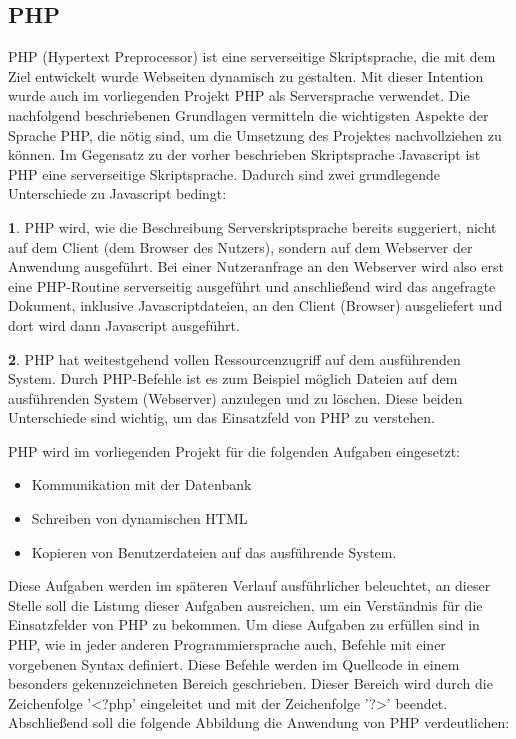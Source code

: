 \subsection{PHP}
\label{sec:Php}

PHP (Hypertext Preprocessor) ist eine serverseitige Skriptsprache, die mit dem Ziel entwickelt wurde Webseiten dynamisch
zu gestalten.
Mit dieser Intention wurde auch im vorliegenden Projekt PHP als Serversprache verwendet. Die nachfolgend beschriebenen
Grundlagen vermitteln die wichtigsten Aspekte der Sprache PHP, die nötig sind, um die Umsetzung des Projektes
nachvollziehen zu können.
Im Gegensatz zu der vorher beschrieben Skriptsprache Javascript ist PHP eine serverseitige Skriptsprache. Dadurch sind
zwei grundlegende Unterschiede zu Javascript bedingt:

\textbf{1}. PHP wird, wie die Beschreibung Serverskriptsprache bereits suggeriert, nicht auf dem Client (dem Browser des Nutzers),
sondern auf dem Webserver der Anwendung ausgeführt. Bei einer Nutzeranfrage an den Webserver wird also erst eine PHP-Routine serverseitig ausgeführt und anschließend wird das angefragte Dokument, inklusive
Javascriptdateien, an den Client (Browser) ausgeliefert und dort wird dann Javascript ausgeführt.

\textbf{2}. PHP hat weitestgehend vollen Ressourcenzugriff auf dem ausführenden System. Durch PHP-Befehle ist es zum Beispiel möglich Dateien auf dem ausführenden System (Webserver) anzulegen und zu löschen.
Diese beiden Unterschiede sind wichtig, um das Einsatzfeld von PHP zu verstehen.

PHP wird im vorliegenden Projekt für die folgenden Aufgaben eingesetzt:
\begin{itemize}
  \item Kommunikation mit der Datenbank
  \item Schreiben von dynamischen HTML
  \item Kopieren von Benutzerdateien auf das ausführende System.
\end{itemize}

Diese Aufgaben werden im späteren Verlauf ausführlicher beleuchtet, an dieser Stelle soll die Listung dieser Aufgaben
ausreichen, um ein Verständnis für die Einsatzfelder von PHP zu bekommen.
Um diese Aufgaben zu erfüllen sind in PHP, wie in jeder anderen Programmiersprache auch, Befehle mit einer vorgebenen
Syntax definiert. Diese Befehle werden im Quellcode in einem besonders gekennzeichneten Bereich geschrieben. Dieser
Bereich wird durch die Zeichenfolge '<?php' eingeleitet und mit der Zeichenfolge '?>' beendet.
Abschließend soll die folgende Abbildung die Anwendung von PHP verdeutlichen:


